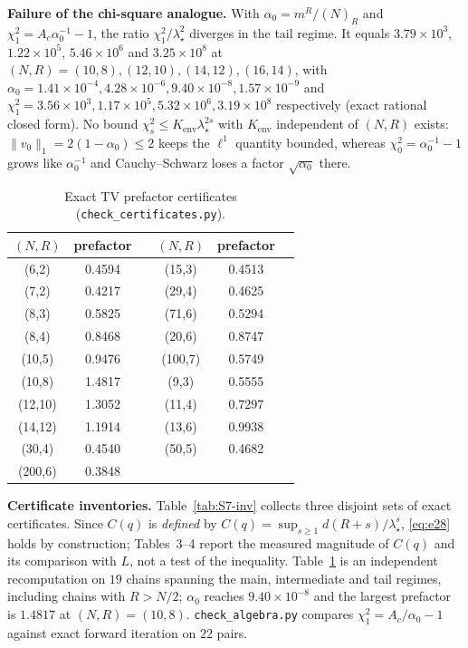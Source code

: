 \documentclass[twoside,11pt]{article}
\begin{document}
\textbf{Failure of the chi-square analogue.} With
$\alpha_0=m^R/(N)_R$ and $\chi^2_1=A_c\alpha_0^{-1}-1$, the ratio
$\chi^2_1/\lambda_\star^{2}$ diverges in the tail regime. It equals
$3.79\times10^{3}$, $1.22\times10^{5}$, $5.46\times10^{6}$ and
$3.25\times10^{8}$ at $(N,R)=(10,8),(12,10),(14,12),(16,14)$, with
$\alpha_0=1.41\times10^{-4},4.28\times10^{-6},9.40\times10^{-8},
1.57\times10^{-9}$ and
$\chi^2_1=3.56\times10^{3},1.17\times10^{5},5.32\times10^{6},
3.19\times10^{8}$ respectively (exact rational closed form). No bound
$\chi^2_s\le K_{\mathrm{env}}\lambda_\star^{2s}$ with $K_{\mathrm{env}}$ independent
of $(N,R)$ exists: $\|v_0\|_1=2(1-\alpha_0)\le2$ keeps the $\ell^1$ quantity
bounded, whereas $\chi^2_0=\alpha_0^{-1}-1$ grows like $\alpha_0^{-1}$ and
Cauchy--Schwarz loses a factor $\sqrt{\alpha_0}$ there.
\begin{table}[htbp]
\centering
\begin{tabular}{ccc@{\qquad}ccc}
\toprule
$(N,R)$ & prefactor & & $(N,R)$ & prefactor & \\
\midrule
(6,2) & 0.4594 && (15,3) & 0.4513 \\
(7,2) & 0.4217 && (29,4) & 0.4625 \\
(8,3) & 0.5825 && (71,6) & 0.5294 \\
(8,4) & 0.8468 && (20,6) & 0.8747 \\
(10,5) & 0.9476 && (100,7) & 0.5749 \\
(10,8) & 1.4817 && (9,3) & 0.5555 \\
(12,10) & 1.3052 && (11,4) & 0.7297 \\
(14,12) & 1.1914 && (13,6) & 0.9938 \\
(30,4) & 0.4540 && (50,5) & 0.4682 \\
(200,6) & 0.3848 && & & \\
\bottomrule
\end{tabular}
\caption{Exact TV prefactor certificates (\texttt{check\_certificates.py}).}
\label{tab:S7-pref}

\end{table}

\textbf{Certificate inventories.} Table~\ref{tab:S7-inv}
collects three disjoint sets of exact certificates. Since $C(q)$ is
\emph{defined} by $C(q)=\sup_{s\ge1}d(R+s)/\lambda_\star^{s}$, \eqref{eq:e28} holds
by construction; Tables~3--4 report the measured magnitude of $C(q)$ and its
comparison with $L$, not a test of the inequality.
Table~\ref{tab:S7-pref} is an independent recomputation on $19$ chains
spanning the main, intermediate and tail regimes, including chains with
$R>N/2$; $\alpha_0$ reaches $9.40\times10^{-8}$ and the largest prefactor
is $1.4817$ at $(N,R)=(10,8)$. \texttt{check\_algebra.py} compares
$\chi^2_1=A_c/\alpha_0-1$ against exact forward iteration on $22$ pairs.
\end{document}
